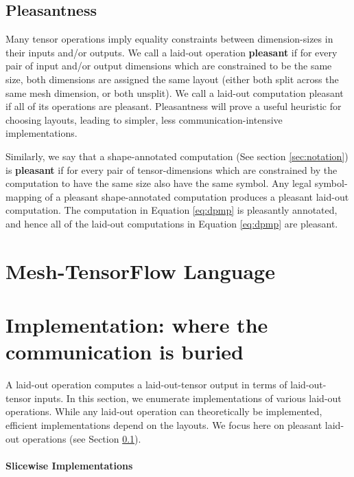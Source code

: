 \documentclass{article}
\begin{document}
\begin{itemize}
\subsection{Pleasantness} \label{sec:pleasant}
Many tensor operations imply equality constraints between dimension-sizes in their inputs and/or outputs.  We call a laid-out operation \textbf{pleasant} if for every pair of input and/or output dimensions which are constrained to be the same size, both dimensions are assigned the same layout (either both split across the same mesh dimension, or both unsplit).  We call a laid-out computation pleasant if all of its operations are pleasant.  Pleasantness will prove a useful heuristic for choosing layouts, leading to simpler, less communication-intensive implementations.

Similarly, we say that a shape-annotated computation (See section \ref{sec:notation}) is \textbf{pleasant} if for every pair of tensor-dimensions which are constrained by the computation to have the same size also have the same symbol.  Any legal symbol-mapping of a pleasant shape-annotated computation produces a pleasant laid-out computation.  The computation in Equation \ref{eq:dpmp} is pleasantly annotated, and hence all of the laid-out computations in Equation \ref{eq:dpmp} are pleasant.


\section{Mesh-TensorFlow Language}

\section{Implementation: where the communication is buried} \label{sec:impl}

A laid-out operation computes a laid-out-tensor output in terms of laid-out-tensor inputs.  In this section, we enumerate implementations of various laid-out operations.   While any laid-out operation can theoretically be implemented, efficient implementations depend on the layouts.  We focus here on pleasant laid-out operations (see Section \ref{sec:pleasant}).





\paragraph{Slicewise Implementations}


\end{itemize}
\end{document}
